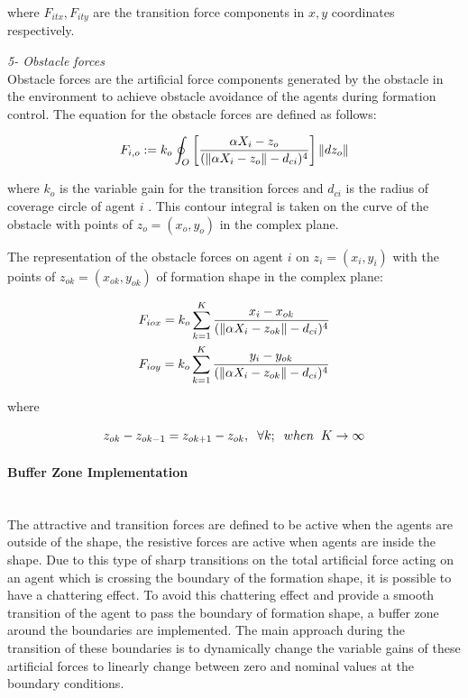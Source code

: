 where  $F_{itx} , F_{ity} $ are the transition force components in $x,y$ coordinates respectively. \newline
			
\textit{			5- Obstacle forces} \\ 
Obstacle forces are the artificial force components generated by the obstacle in the environment to achieve obstacle avoidance of the agents during formation control. 	
The equation for the obstacle forces are defined as follows:	
			
\begin{equation}
F_{i,o} := k_o  \oint_O \left[\frac{\alpha X_i - z_o}{(\left\lVert\alpha X_i - z_o\right\rVert - d_{ci})^4}\right] \left\lVert dz_o\right\rVert
\end{equation}
			
where $k_o$ is the variable gain for the transition forces and $d_{ci}$ is the radius of coverage circle of agent $i$ . This contour integral is taken on the curve of the obstacle with  points of $z_o = (x_o,y_o)$ in the complex plane.
			
The representation of the obstacle forces on agent $i$ on $z_i = (x_i, y_i)$ with the points of  $z_{ok} = (x_{ok},y_{ok})$ of formation shape in the complex plane:
			
\begin{align*}
& F_{iox} = k_o   \sum_{k=1}^{K} \frac{x_i -x_{ok}}{(\left\lVert\alpha X_i - z_{ok}\right\rVert -d_{ci})^4}\\
& F_{ioy} = k_o   \sum_{k=1}^{K} \frac{y_i - y_{ok}}{(\left\lVert\alpha X_i - z_{ok}\right\rVert -d_{ci})^4}\\
\end{align*}
			
where

\begin{equation}
z_{ok}- z_{ok -1} = z_{ok+1} - z_{ok}, \hspace{0.2cm}  \forall k ;  \hspace{0.2cm} when  \hspace{0.2cm} K \to\infty
\end{equation}
			
\paragraph{Buffer Zone Implementation}\hspace{0pt} \\
The attractive and transition forces are defined to be active when the agents are outside of the shape, the resistive forces are active when agents are inside the shape. Due to this type of sharp transitions on the total artificial force acting on an agent which is crossing the boundary of the formation shape, it is possible to have a chattering effect. To avoid this chattering effect and provide a smooth transition of the agent to pass the boundary of formation shape, a buffer zone around the boundaries are implemented. The main approach during the transition of these boundaries is to dynamically change the variable gains of these artificial forces to linearly change between zero and nominal values at the boundary conditions. 
     
